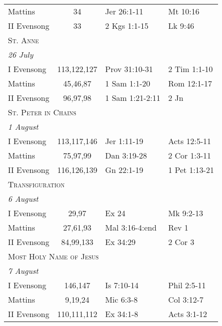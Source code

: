 \begin{longtable}{l c l l}
\hspace{1em} Mattins&34&Jer 26:1-11&Mt 10:16\\
\hspace{1em} II Evensong&33&2 Kgs 1:1-15&Lk 9:46\\
\multicolumn{4}{l}{\textsc{St. Anne}}\\
\multicolumn{4}{l}{\textit{26 July}}\\
\hspace{1em} I Evensong&113,122,127&Prov 31:10-31&2 Tim 1:1-10\\
\hspace{1em} Mattins&45,46,87&1 Sam 1:1-20&Rom 12:1-17\\
\hspace{1em} II Evensong&96,97,98&1 Sam 1:21-2:11&2 Jn\\
%
\multicolumn{4}{l}{\textsc{St. Peter in Chains}}\\
\multicolumn{4}{l}{\textit{1 August}}\\
\hspace{1em} I Evensong&113,117,146&Jer 1:11-19&Acts 12:5-11\\
\hspace{1em} Mattins&75,97,99&Dan 3:19-28&2 Cor 1:3-11\\
\hspace{1em} II Evensong&116,126,139&Gn 22:1-19&1 Pet 1:13-21\\
%
\multicolumn{4}{l}{\textsc{Transfiguration}}\\
\multicolumn{4}{l}{\textit{6 August}}\\
\hspace{1em} I Evensong&29,97&Ex 24&Mk 9:2-13\\
\hspace{1em} Mattins&27,61,93&Mal 3:16-4:end&Rev 1\\
\hspace{1em} II Evensong&84,99,133&Ex 34:29&2 Cor 3\\
%
\multicolumn{4}{l}{\textsc{Most Holy Name of Jesus}}\\
\multicolumn{4}{l}{\textit{7 August}}\\
\hspace{1em} I Evensong&146,147&Is 7:10-14&Phil 2:5-11\\
\hspace{1em} Mattins&9,19,24&Mic 6:3-8&Col 3:12-7\\
\hspace{1em} II Evensong&110,111,112&Ex 34:1-8&Acts 3:1-12\\

\end{longtable}

